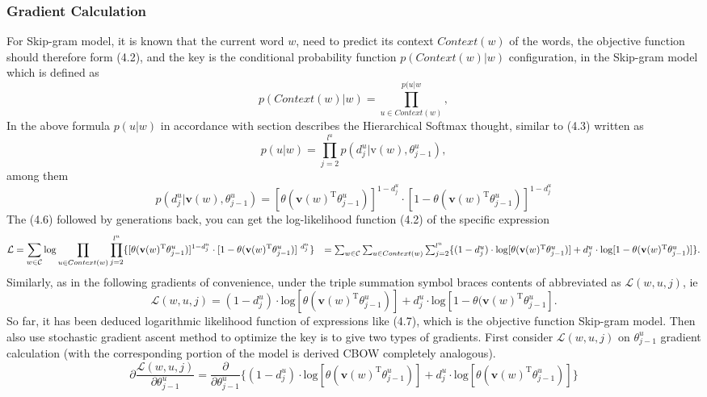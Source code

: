 \subsubsection {Gradient Calculation} 
For Skip-gram model, it is known that the current word $w$, need to predict its context $Context(w)$ of the words, the objective function should therefore form (4.2), and the key is the conditional probability function $p(Context(w)|w)$ configuration, in the Skip-gram model which is defined as
$$p(Context(w)|w)=\prod_{u\in Context(w)}^{p(u|w},$$
In the above formula $p(u|w)$ in accordance with section describes the Hierarchical Softmax thought, similar to (4.3) written as
$$p(u|w)=\prod_{j = 2}^{l^u}p(d^u_j|\text{v}(w),\theta^u_{j-1}), $$
among them
\begin{equation}
p(d^u_j|\mathbf{v}(w),\theta^u_{j-1})=[\theta(\mathbf{v}(w)^{\mathrm{T}}\theta^u_{j-1})]^{1-d^u_j}\cdot[1-\theta(\mathbf{v}(w)^{\mathrm{T}}\theta^u_{j-1})]^{1-d^u_j}
\end{equation}
The (4.6) followed by generations back, you can get the log-likelihood function (4.2) of the specific expression
\begin{equation}
\mathcal{L}=\sum_{w\in\mathcal{C}}\mathrm{log}\prod_{u\in Context(w)}\prod_{j=2}^{l^u}\{[\theta(\mathbf{v}(w)^{\mathrm{T}}\theta^u_{j-1})]^{1-d^u_j}\cdot[1-\theta(\mathbf{v}(w)^{\mathrm{T}}\theta^u_{j-1})]^{\ d^u_j}\} \\
\ \ \ $$ $$=\sum_{w\in\mathcal{C}}\sum_{u\in Context(w)}\sum_{j=2}^{l^u}\{(1-d^u_j)\cdot\mathrm{log}[\theta(\mathbf{v}(w)^{\mathrm{T}}\theta^u_{j-1})]+d^u_j\cdot\mathrm{log}[1-\theta(\mathbf {v}(w)^{\mathrm{T}}\theta^u_{j-1})]\}.
\end{equation}
Similarly, as in the following gradients of convenience, under the triple summation symbol braces contents of abbreviated as $\mathcal{L}(w,u,j)$, ie
$$\mathcal{L}(w,u,j)=(1-d^u_j)\cdot\mathrm{log}[\theta(\mathbf{v}(w)^{\mathrm{T}}\theta^u_{j-1})]+d^u_j\cdot\mathrm{log}[1-\theta(\mathbf{v}(w)^{\mathrm{T}}\theta^u_{j-1}]. $$
So far, it has been deduced logarithmic likelihood function of expressions like (4.7), which is the objective function Skip-gram model. Then also use stochastic gradient ascent method to optimize the key is to give two types of gradients.
First consider $\mathcal{L}(w,u,j)$ on $\theta^u_{j-1}$ gradient calculation (with the corresponding portion of the model is derived CBOW completely analogous).
$$\partial\frac{\mathcal{L}(w, u, j)}{\partial\theta^u_{j-1}}=\frac{\partial}{\partial\theta^u_{j-1}}\{(1-d^u_j)\cdot\mathrm{log}[\theta(\mathbf{v}(w)^{\mathrm{T}}\theta^u_{j-1})]+d^u_j\cdot\mathrm{log}[\theta(\mathbf{v}(w)^{\mathrm{T}}\theta^u_{j-1})]\}$$

